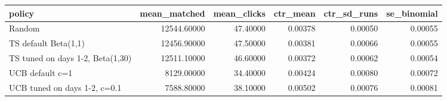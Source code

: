 \begin{tabular}{lrrrrr}
\toprule
policy & mean\_matched & mean\_clicks & ctr\_mean & ctr\_sd\_runs & se\_binomial \\
\midrule
Random & 12544.60000 & 47.40000 & 0.00378 & 0.00050 & 0.00055 \\
TS default Beta(1,1) & 12456.90000 & 47.50000 & 0.00381 & 0.00066 & 0.00055 \\
TS tuned on days 1-2, Beta(1,30) & 12511.10000 & 46.60000 & 0.00372 & 0.00062 & 0.00054 \\
UCB default c=1 & 8129.00000 & 34.40000 & 0.00424 & 0.00080 & 0.00072 \\
UCB tuned on days 1-2, c=0.1 & 7588.80000 & 38.10000 & 0.00502 & 0.00076 & 0.00081 \\
\bottomrule
\end{tabular}
